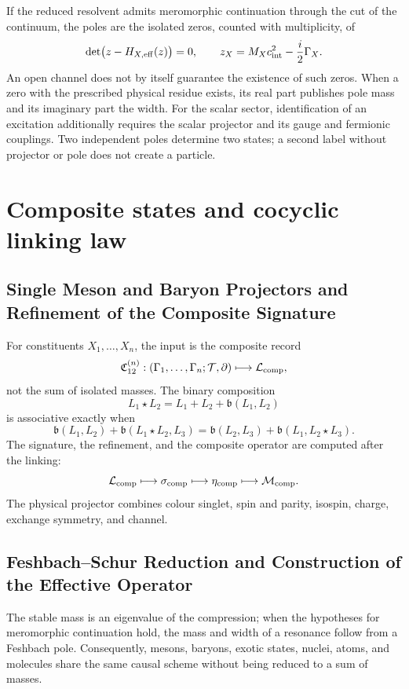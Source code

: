 If the reduced resolvent admits meromorphic continuation through the cut of the
continuum, the poles are the isolated zeros, counted with multiplicity, of
\[
 \det\bigl(z-H_{X,\rm eff}(z)\bigr)=0,
 \qquad
 z_X=M_X c_{\rm int}^2-\frac{i}{2}\Gamma_X.
\]
An open channel does not by itself guarantee the existence of such zeros. When
a zero with the prescribed physical residue exists, its real part publishes pole
mass and its imaginary part the width. For the
scalar sector, identification of an excitation additionally requires the scalar
projector and its gauge and fermionic couplings. Two independent poles
determine two states; a second label without projector or pole does not create a
particle.

\section{Composite states and cocyclic linking law}

\subsection{Single Meson and Baryon Projectors and Refinement of the Composite Signature}

For constituents \(X_1,\ldots,X_n\), the input is the composite record
\[
 \mathfrak C_{12}^{(n)}:
 (\Gamma_1,\ldots,\Gamma_n;\mathcal T,\partial)
 \longmapsto\mathcal L_{\rm comp},
\]
not the sum of isolated masses. The binary composition
\[
 L_1\star L_2=L_1+L_2+\mathfrak b(L_1,L_2)
\]
is associative exactly when
\[
 \mathfrak b(L_1,L_2)+\mathfrak b(L_1\star L_2,L_3)
 =\mathfrak b(L_2,L_3)+\mathfrak b(L_1,L_2\star L_3).
\]
The signature, the refinement, and the composite operator are computed after the linking:
\[
 \mathcal L_{\rm comp}\longmapsto\sigma_{\rm comp}
 \longmapsto\eta_{\rm comp}\longmapsto\mathcal M_{\rm comp}.
\]
The physical projector combines colour singlet, spin and parity, isospin, charge,
exchange symmetry, and channel.

\subsection{Feshbach--Schur Reduction and Construction of the Effective Operator}

The stable mass is an eigenvalue of the
compression; when the hypotheses for meromorphic continuation hold, the mass
and width of a resonance follow from a Feshbach pole. Consequently,
mesons, baryons, exotic states, nuclei, atoms, and
molecules share the same causal scheme without being reduced to a sum of masses.

